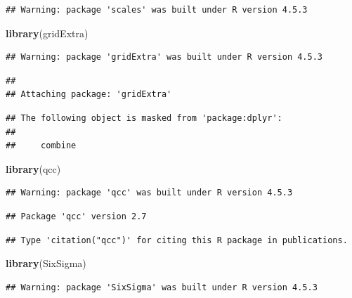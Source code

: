 \documentclass[
]{article}
\newenvironment{Shaded}{\begin{snugshade}}{\end{snugshade}}
\newcommand{\FunctionTok}[1]{\textcolor[rgb]{0.13,0.29,0.53}{\textbf{#1}}}
\newcommand{\NormalTok}[1]{#1}
\begin{document}
\begin{verbatim}
## Warning: package 'scales' was built under R version 4.5.3
\end{verbatim}

\begin{Shaded}
\begin{Highlighting}[]
\FunctionTok{library}\NormalTok{(gridExtra)}
\end{Highlighting}
\end{Shaded}

\begin{verbatim}
## Warning: package 'gridExtra' was built under R version 4.5.3
\end{verbatim}

\begin{verbatim}
## 
## Attaching package: 'gridExtra'
\end{verbatim}

\begin{verbatim}
## The following object is masked from 'package:dplyr':
## 
##     combine
\end{verbatim}

\begin{Shaded}
\begin{Highlighting}[]
\FunctionTok{library}\NormalTok{(qcc)}
\end{Highlighting}
\end{Shaded}

\begin{verbatim}
## Warning: package 'qcc' was built under R version 4.5.3
\end{verbatim}

\begin{verbatim}
## Package 'qcc' version 2.7
\end{verbatim}

\begin{verbatim}
## Type 'citation("qcc")' for citing this R package in publications.
\end{verbatim}

\begin{Shaded}
\begin{Highlighting}[]
\FunctionTok{library}\NormalTok{(SixSigma)}
\end{Highlighting}
\end{Shaded}

\begin{verbatim}
## Warning: package 'SixSigma' was built under R version 4.5.3
\end{verbatim}
\end{document}
